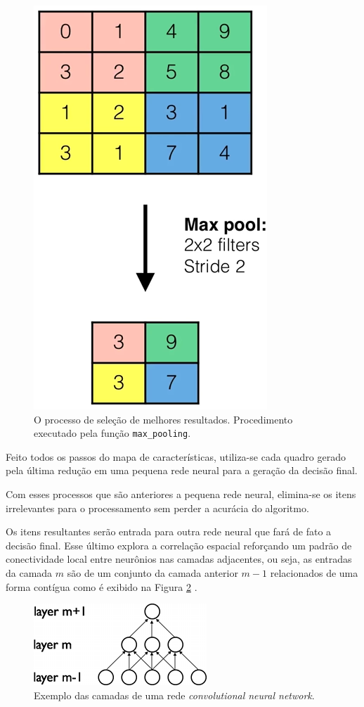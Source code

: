 \documentclass[10pt, conference]{IEEEtran}
\begin{document}
			\begin{figure}[h]
				\centering
				\includegraphics[width=0.4\linewidth]{img/max_pooling.png}
				\caption{O processo de seleção de melhores resultados. Procedimento executado pela função \texttt{max\_pooling}.}
				\label{fig:max_pooling.png}
			\end{figure}

			Feito todos os passos do mapa de características, utiliza-se cada quadro gerado pela última redução em uma pequena rede neural para a geração da decisão final.
			
			Com esses processos que são anteriores a pequena rede neural, elimina-se os itens irrelevantes para o processamento sem perder a acurácia do algoritmo. 

			Os itens resultantes serão entrada para outra rede neural que fará de fato a decisão final. Esse último explora a correlação espacial reforçando um padrão de conectividade local entre neurônios nas camadas adjacentes, ou seja, as entradas da camada $ m $ são de um conjunto da camada anterior $ m-1 $ relacionados de uma forma contígua como é exibido na Figura \ref{fig:layers_cnn} \cite{LeCun1989} \cite{LeCun1990H}.
			
			\begin{figure}[h]
				\centering
				\includegraphics[width=0.8\linewidth]{img/layers_cnn.png}
				\caption{Exemplo das camadas de uma rede \textit{convolutional neural network}.}
				\label{fig:layers_cnn}
			\end{figure}
			
\end{document}

